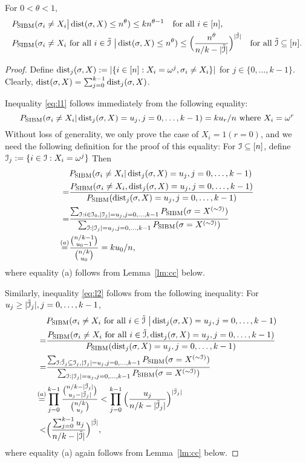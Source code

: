 \documentclass{article}
\begin{document}
\begin{lemma} \label{lm:bq}
For $0<\theta<1$,
\begin{align}
& P_{\operatorname{SIBM}}(\sigma_i \neq X_i
\big| \operatorname{dist}(\sigma,X) \le n^\theta) \le k n^{\theta-1}
\quad \text{for all~} i\in[n] , \label{eq:l1}\\
& P_{\operatorname{SIBM}}(\sigma_i \neq X_i \text{~for all~}  i\in\tilde{\mathcal{I}}
~\big| \operatorname{dist}(\sigma,X) \le n^\theta) \le \Big(\frac{n^\theta}{n/k - |\tilde{\mathcal{I}}|}
\Big)^{|\tilde{\mathcal{I}}|}
\quad \text{for all~} \tilde{\mathcal{I}}\subseteq [n] .   \label{eq:l2}
\end{align}
\end{lemma}
\begin{proof}
Define $\operatorname{dist}_j(\sigma,X):=|\{i\in[n]:X_i=\omega^j, \sigma_i \neq X_i\}|$ for $j \in \{0, \dots, k-1\}$. Clearly, $\operatorname{dist}(\sigma,X)=\sum_{j=0}^{k-1} \operatorname{dist}_j(\sigma,X)$.

Inequality \eqref{eq:l1} follows immediately from the following equality:
$$
P_{\operatorname{SIBM}}(\sigma_i \neq X_i |
\operatorname{dist}_j(\sigma,X)=u_j,
j=0,\dots,k-1) 
= k u_r / n \textrm{ where } X_i = \omega^r
$$
Without loss of generality,
we only prove the case of $X_i=1 (r=0)$, and
we need the following definition for the proof of this equality:
For $\mathcal{I}\subseteq[n]$, define $\mathcal{I}_j:=\{i\in\mathcal{I}:X_i=\omega^j\}$ Then
\begin{align*}
& P_{\operatorname{SIBM}}(\sigma_i \neq X_i |
\operatorname{dist}_j(\sigma, X) = u_j,j=0,\dots, k-1)  \\
= & \frac{P_{\operatorname{SIBM}}(\sigma_i \neq X_i ,
\operatorname{dist}_j(\sigma, X) = u_j,j=0,\dots, k-1)}
{P_{\operatorname{SIBM}}(
\operatorname{dist}_j(\sigma, X) = u_j,j=0,\dots, k-1)} \\
= & \frac{\sum_{\mathcal{I}:i\in\mathcal{I}_0,|\mathcal{I}_j|=u_j,j=0,\dots,k-1}P_{\operatorname{SIBM}}(\sigma=X^{(\sim\mathcal{I})}) }
{\sum_{\mathcal{I}: |\mathcal{I}_j|=u_j,j=0,\dots,k-1}P_{\operatorname{SIBM}}(\sigma=X^{(\sim\mathcal{I})}) } \\
\overset{(a)}{=} & \frac{\binom{n/k-1}{u_0 -1}}
{\binom{n/k}{u_0} }
= ku_0/n ,
\end{align*}
where equality (a) follows from Lemma~\ref{lm:cc} below.

Similarly, inequality \eqref{eq:l2} follows from the following inequality:
For $u_j\geq |\tilde{\mathcal{I}}_j|, j=0, \dots, k-1$,
\begin{align*}
& P_{\operatorname{SIBM}}(\sigma_i \neq X_i \text{~for all~}  i\in\tilde{\mathcal{I}} ~ \big|
\operatorname{dist}_j(\sigma, X) = u_j,j=0,\dots, k-1)  \\
= & \frac{P_{\operatorname{SIBM}}(\sigma_i \neq X_i \text{~for all~}  i\in\tilde{\mathcal{I}} ,
\operatorname{dist}_j(\sigma, X) = u_j,j=0,\dots, k-1)}{P_{\operatorname{SIBM}}(
\operatorname{dist}_j(\sigma, X) = u_j,j=0,\dots, k-1)} \\
= & \frac{\sum_{\mathcal{I}:\tilde{\mathcal{I}}_j\subseteq\mathcal{I}_j,
|\mathcal{I}_j|=u_j,j=0,\dots,k-1}P_{\operatorname{SIBM}}(\sigma=X^{(\sim\mathcal{I})}) }
{\sum_{\mathcal{I}:|\mathcal{I}_j|=u_j,j=0,\dots,k-1}P_{\operatorname{SIBM}}(\sigma=X^{(\sim\mathcal{I})}) }  \\
\overset{(a)}{=} & \prod_{j=0}^{k-1} \frac{\binom{n/k-|\tilde{\mathcal{I}}_j|}{u_j -|\tilde{\mathcal{I}}_j|} }
{\binom{n/k}{u_j} }
< \prod_{j=0}^{k-1}\Big(\frac{u_j}{n/k- |\tilde{\mathcal{I}}_j|} \Big)^{|\tilde{\mathcal{I}}_j|}
\\
< & \Big(\frac{\sum_{j=0}^{k-1} u_j}{n/k- |\tilde{\mathcal{I}}|} \Big)^{|\tilde{\mathcal{I}}|}  ,
\end{align*}
where equality (a) again follows from Lemma~\ref{lm:cc} below.
\end{proof}
\end{document}
